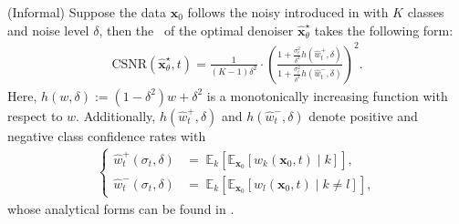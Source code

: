 \begin{theorem}\label{lem:main}(Informal)
Suppose the data $\bm x_0$ follows the noisy \MoLRG\;introduced in  with $K$ classes and noise level $\delta$, then  the \CSNR~of the optimal denoiser $\hat{\bm x}_\theta^{\star}$ takes the following form:
    \begin{align}\label{eq:csnr}
        \mathrm{CSNR}(\hat{\bm x}_\theta^{\star},t) = \frac{1}{(K-1)\delta^2}\cdot \left(\frac{1 + \frac{\sigma_t^2}{\delta^2}h(\hat{w}_t^+, \delta)}{1 + \frac{\sigma_t^2}{\delta^2}h(\hat{w}_t^-, \delta)}\right)^2.
    \end{align}
Here, $h(w, \delta) := (1 - \delta^2)w + \delta^2$ is a monotonically increasing function with respect to $w$. Additionally, $h(\hat{w}_t^+, \delta)$ and $h(\hat{w}_t^-, \delta)$ denote positive and negative class confidence rates with%
\begin{align*}
\begin{cases}
\hat w_t^+(\sigma_t, \delta) &=\; \mathbb E_k[ \mathbb{E}_{\bm x_0}[w_k(\bm x_0, t)\mid k]], \\
\hat w_t^-(\sigma_t, \delta) &=\; \mathbb E_{k}[\mathbb{E}_{\bm x_0}[w_{l}(\bm x_0, t) \mid k \neq l ]],
\end{cases}
\end{align*}
whose analytical forms can be found in .  
\end{theorem}



